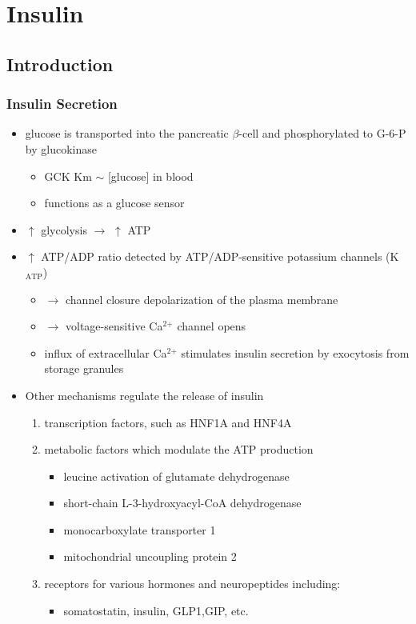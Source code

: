 \documentclass{scrartcl}
\begin{document}
\section{Insulin}
\label{sec:org295bf42}
\subsection{Introduction}
\label{sec:org3817c5a}
\subsubsection{Insulin Secretion}
\label{sec:org6af90d1}
\begin{itemize}
\item glucose is transported into the pancreatic \(\beta\)-cell and phosphorylated to G-6-P by glucokinase
\begin{itemize}
\item GCK Km \(\sim\) [glucose] in  blood
\item functions as a glucose sensor
\end{itemize}
\item \(\uparrow\) glycolysis \(\to\) \(\uparrow\) ATP
\item \(\uparrow\) ATP/ADP ratio detected by ATP/ADP-sensitive potassium channels (K\(_{\text{ATP}}\))
\begin{itemize}
\item \(\to\) channel closure depolarization of the plasma membrane
\item \(\to\) voltage-sensitive Ca\(^{\text{2+}}\) channel opens
\item influx of extracellular Ca\(^{\text{2+}}\) stimulates insulin secretion by
exocytosis from storage granules
\end{itemize}

\item Other mechanisms regulate the release of insulin
\begin{enumerate}
\item transcription factors, such as HNF1A and HNF4A

\item metabolic factors which modulate the ATP production
\begin{itemize}
\item leucine activation of glutamate dehydrogenase
\item short-chain L-3-hydroxyacyl-CoA dehydrogenase
\item monocarboxylate transporter 1
\item mitochondrial uncoupling protein 2
\end{itemize}
\item receptors for various hormones and neuropeptides including:
\begin{itemize}
\item somatostatin, insulin, GLP1,GIP, etc.
\end{itemize}
\end{enumerate}
\end{itemize}
\end{document}
